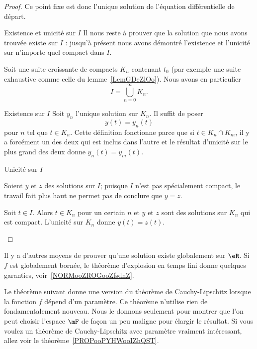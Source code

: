 \begin{proof}
	Ce point fixe est donc l'unique solution de l'équation différentielle de départ.

	\begin{subproof}
		\item[Existence et unicité sur \( I\)]
		Il nous reste à prouver que la solution que nous avons trouvée existe sur \( I\) : jusqu'à présent nous avons démontré l'existence et l'unicité sur n'importe quel compact dans \( I\).

		Soit une suite croissante de compacts \( K_n\) contenant \( t_0\) (par exemple une suite exhaustive comme celle du lemme~\ref{LemGDeZlOo}). Nous avons en particulier
		\begin{equation}
			I=\bigcup_{n=0}^{\infty}K_n.
		\end{equation}
		\item[Existence sur \( I\)]
		Soit \( y_n\) l'unique solution sur \( K_n\). Il suffit de poser
		\begin{equation}
			y(t)=y_n(t)
		\end{equation}
		pour \( n\) tel que \( t\in K_n\). Cette définition fonctionne parce que si \( t\in K_n\cap K_m\), il y a forcément un des deux qui est inclus dans l'autre et le résultat d'unicité sur le plus grand des deux donne \( y_n(t)=y_m(t)\).

		\item[Unicité sur \( I\)]

		Soient \( y\) et \(z \) des solutions sur \( I\); puisque \( I\) n'est pas spécialement compact, le travail fait plus haut ne permet pas de conclure que \( y=z\).

		Soit \( t\in I\). Alors \( t\in K_n\) pour un certain \( n\) et \( y\) et \( z\) sont des solutions sur \( K_n\) qui est compact. L'unicité sur \( K_n\) donne \( y(t)=z(t)\).
	\end{subproof}
\end{proof}

\begin{normaltext}
	Il y a d'autres moyens de prouver qu'une solution existe globalement sur \( \eR\). Si \( f\) est globalement bornée, le théorème d'explosion en temps fini donne quelques garanties, voir~\ref{NORMooZROGooZfsdnZ}.
\end{normaltext}

Le théorème suivant donne une version du théorème de Cauchy-Lipschitz lorsque la fonction \( f\) dépend d'un paramètre. Ce théorème n'utilise rien de fondamentalement nouveau. Nous le donnons seulement pour montrer que l'on peut choisir l'espace \( \mF\) de façon un peu maligne pour élargir le résultat. Si vous voulez un théorème de Cauchy-Lipschitz avec paramètre vraiment intéressant, allez voir le théorème~\ref{PROPooPYHWooIZhQST}.

